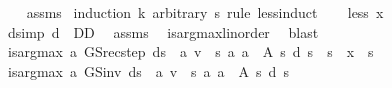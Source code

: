 \begin{isabellebody}
%
\isadelimproof
\ \ %
\endisadelimproof
%
\isatagproof
{}\isamarkupfalse%
\ assms\isanewline
{}\isamarkupfalse%
\ {\isacharparenleft}{\kern0pt}induction\ k\ arbitrary{\isacharcolon}{\kern0pt}\ s\ rule{\isacharcolon}{\kern0pt}\ less{\isacharunderscore}{\kern0pt}induct{\isacharparenright}{\kern0pt}\isanewline
\ \ \isamarkupfalse%
\ {\isacharparenleft}{\kern0pt}less\ x{\isacharparenright}{\kern0pt}\isanewline
\ \ \isamarkupfalse%
\ d{\isacharbrackleft}{\kern0pt}simp{\isacharbrackright}{\kern0pt}{\isacharcolon}{\kern0pt}\ {\isachardoublequoteopen}d\ {\isasymin}\ D\isactrlsub D{\isachardoublequoteclose}\ \isamarkupfalse%
\ assms\ \isamarkupfalse%
\ is{\isacharunderscore}{\kern0pt}arg{\isacharunderscore}{\kern0pt}max{\isacharunderscore}{\kern0pt}linorder\ \isamarkupfalse%
\ blast\isanewline
\isanewline
\ \ \isamarkupfalse%
\ {\isachardoublequoteopen}is{\isacharunderscore}{\kern0pt}arg{\isacharunderscore}{\kern0pt}max\ {\isacharparenleft}{\kern0pt}{\isasymlambda}a{\isachardot}{\kern0pt}\ GS{\isacharunderscore}{\kern0pt}rec{\isacharunderscore}{\kern0pt}step\ {\isacharparenleft}{\kern0pt}d{\isacharparenleft}{\kern0pt}s\ {\isacharcolon}{\kern0pt}{\isacharequal}{\kern0pt}\ a{\isacharparenright}{\kern0pt}{\isacharparenright}{\kern0pt}\ v\ {\isachardollar}{\kern0pt}\ s{\isacharparenright}{\kern0pt}\ {\isacharparenleft}{\kern0pt}{\isasymlambda}a{\isachardot}{\kern0pt}\ a\ {\isasymin}\ A\ s{\isacharparenright}{\kern0pt}\ {\isacharparenleft}{\kern0pt}d\ s{\isacharparenright}{\kern0pt}{\isachardoublequoteclose}\ \ {\isachardoublequoteopen}s\ {\isasymle}\ x{\isachardoublequoteclose}\ \ s\isanewline
\ \ \isamarkupfalse%
\ {\isacharminus}{\kern0pt}\isanewline
\ \ \ \ \isamarkupfalse%
\ {\isachardoublequoteopen}is{\isacharunderscore}{\kern0pt}arg{\isacharunderscore}{\kern0pt}max\ {\isacharparenleft}{\kern0pt}{\isasymlambda}a{\isachardot}{\kern0pt}\ GS{\isacharunderscore}{\kern0pt}inv\ {\isacharparenleft}{\kern0pt}d{\isacharparenleft}{\kern0pt}s\ {\isacharcolon}{\kern0pt}{\isacharequal}{\kern0pt}\ a{\isacharparenright}{\kern0pt}{\isacharparenright}{\kern0pt}\ v\ {\isachardollar}{\kern0pt}\ s{\isacharparenright}{\kern0pt}\ {\isacharparenleft}{\kern0pt}{\isasymlambda}a{\isachardot}{\kern0pt}\ a\ {\isasymin}\ A\ s{\isacharparenright}{\kern0pt}\ {\isacharparenleft}{\kern0pt}d\ s{\isacharparenright}{\kern0pt}{\isachardoublequoteclose}\isanewline
\ \ \ \ \ \ \isamarkupfalse%

\end{isabellebody}
